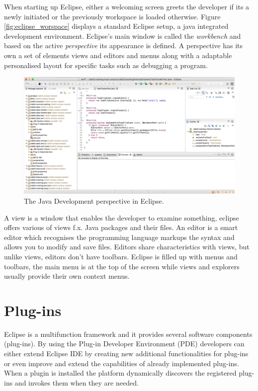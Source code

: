 When starting up Eclipse, either a welcoming screen greets the developer if its a newly initiated or the previously workspace is loaded otherwise. Figure \ref{fig:eclipse_worspace} displays a standard Eclipse setup, a java integrated development environment. Eclipse's main window is called the \textit{workbench} and based on the active \textit{perspective} its appearance is defined. A perspective has its own a set of elements views and editors and menus along with a adaptable personalised layout for specific tasks such as debugging a program. 
\label{sec:TheEclipseIDE:menusviewsandeditors}
	\begin{figure}[!ht]
		\begin{center}
			\includegraphics[width=\textwidth]{figures/eclipse_workspace.png}
		\end{center}
		\caption{The Java Development perspective in Eclipse.}
		\label{fig:eclipse_workspace}
	\end{figure}
A view is a window that enables the developer to examine something, eclipse offers various of views f.x. Java packages and their files. An editor is a smart editor which recognises the programming language markups the syntax and allows you to modify and save files. Editors share characteristics with views, but unlike views, editors don't have toolbars. Eclipse is filled up with menus and toolbars, the main menu is at the top of the screen while views and explorers usually provide their own context menus.




\section{Plug-ins}
\label{sec:TheEclipseIDE:plugins}
Eclipse is a multifunction framework and it provides several software components (plug-ins). By using the Plug-in Developer Environment (PDE) developers can either extend Eclipse IDE by creating new additional functionalities for plug-ins or even improve and extend the capabilities of already implemented plug-ins. When a plugin is installed the platform dynamically discovers the registered plug-ins and invokes them when they are needed.

